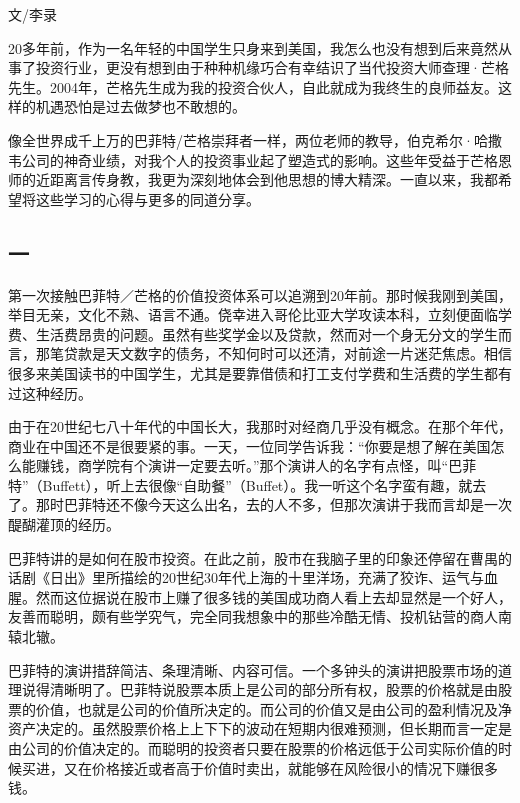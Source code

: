 \cleardoublepage
{}

{\kaishu\raggedleft 文/李录\par}

20多年前，作为一名年轻的中国学生只身来到美国，我怎么也没有想到后来竟然从事了投资行业，更没有想到由于种种机缘巧合有幸结识了当代投资大师查理·芒格先生。2004年，芒格先生成为我的投资合伙人，自此就成为我终生的良师益友。这样的机遇恐怕是过去做梦也不敢想的。
\par

像全世界成千上万的巴菲特/芒格崇拜者一样，两位老师的教导，伯克希尔·哈撒韦公司的神奇业绩，对我个人的投资事业起了塑造式的影响。这些年受益于芒格恩师的近距离言传身教，我更为深刻地体会到他思想的博大精深。一直以来，我都希望将这些学习的心得与更多的同道分享。
\par

\subsection*{一}

第一次接触巴菲特／芒格的价值投资体系可以追溯到20年前。那时候我刚到美国，举目无亲，文化不熟、语言不通。侥幸进入哥伦比亚大学攻读本科，立刻便面临学费、生活费昂贵的问题。虽然有些奖学金以及贷款，然而对一个身无分文的学生而言，那笔贷款是天文数字的债务，不知何时可以还清，对前途一片迷茫焦虑。相信很多来美国读书的中国学生，尤其是要靠借债和打工支付学费和生活费的学生都有过这种经历。
\par

由于在20世纪七八十年代的中国长大，我那时对经商几乎没有概念。在那个年代，商业在中国还不是很要紧的事。一天，一位同学告诉我：“你要是想了解在美国怎么能赚钱，商学院有个演讲一定要去听。”那个演讲人的名字有点怪，叫“巴菲特”（Buffett），听上去很像“自助餐”（Buffet）。我一听这个名字蛮有趣，就去了。那时巴菲特还不像今天这么出名，去的人不多，但那次演讲于我而言却是一次醍醐灌顶的经历。
\par

巴菲特讲的是如何在股市投资。在此之前，股市在我脑子里的印象还停留在曹禺的话剧《日出》里所描绘的20世纪30年代上海的十里洋场，充满了狡诈、运气与血腥。然而这位据说在股市上赚了很多钱的美国成功商人看上去却显然是一个好人，友善而聪明，颇有些学究气，完全同我想象中的那些冷酷无情、投机钻营的商人南辕北辙。
\par

巴菲特的演讲措辞简洁、条理清晰、内容可信。一个多钟头的演讲把股票市场的道理说得清晰明了。巴菲特说股票本质上是公司的部分所有权，股票的价格就是由股票的价值，也就是公司的价值所决定的。而公司的价值又是由公司的盈利情况及净资产决定的。虽然股票价格上上下下的波动在短期内很难预测，但长期而言一定是由公司的价值决定的。而聪明的投资者只要在股票的价格远低于公司实际价值的时候买进，又在价格接近或者高于价值时卖出，就能够在风险很小的情况下赚很多钱。
\par

